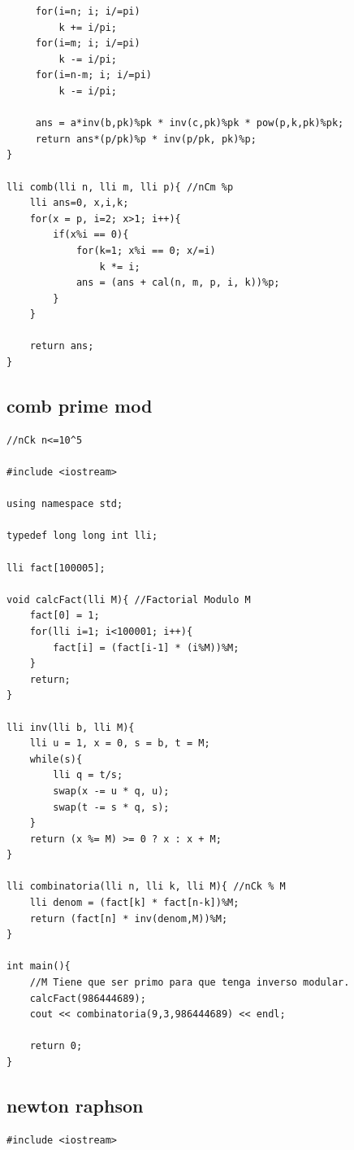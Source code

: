 \documentclass[twoside]{article}
\begin{document}
\begin{multicols*}{2}
\begin{verbatim}
	 for(i=n; i; i/=pi)
		 k += i/pi;
	 for(i=m; i; i/=pi)
		 k -= i/pi;
	 for(i=n-m; i; i/=pi)
		 k -= i/pi;
	 
	 ans = a*inv(b,pk)%pk * inv(c,pk)%pk * pow(p,k,pk)%pk;
	 return ans*(p/pk)%p * inv(p/pk, pk)%p;
}

lli comb(lli n, lli m, lli p){ //nCm %p
	lli ans=0, x,i,k;
	for(x = p, i=2; x>1; i++){
		if(x%i == 0){
			for(k=1; x%i == 0; x/=i)
				k *= i;
			ans = (ans + cal(n, m, p, i, k))%p;
		}
	}
	
	return ans;
}

\end{verbatim}

\subsectionfont{\large\bfseries\sffamily\underline}
\subsection*{comb prime mod}
\begin{verbatim}
//nCk n<=10^5

#include <iostream>

using namespace std;

typedef long long int lli;

lli fact[100005];

void calcFact(lli M){ //Factorial Modulo M
	fact[0] = 1;
	for(lli i=1; i<100001; i++){
		fact[i] = (fact[i-1] * (i%M))%M;
	}
	return;
}

lli inv(lli b, lli M){
	lli u = 1, x = 0, s = b, t = M;
	while(s){
		lli q = t/s;
		swap(x -= u * q, u);
		swap(t -= s * q, s);
	}
	return (x %= M) >= 0 ? x : x + M;
}

lli combinatoria(lli n, lli k, lli M){ //nCk % M
	lli denom = (fact[k] * fact[n-k])%M;
	return (fact[n] * inv(denom,M))%M;
}

int main(){
	//M Tiene que ser primo para que tenga inverso modular. 
	calcFact(986444689);
	cout << combinatoria(9,3,986444689) << endl;
	
	return 0;
}

\end{verbatim}

\subsectionfont{\large\bfseries\sffamily\underline}
\subsection*{newton raphson}
\begin{verbatim}
#include <iostream>


\end{verbatim}
\end{multicols*}
\end{document}
